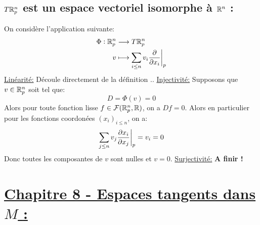    \subsection*{\( T\mathbb{R}^n_p \) est un espace vectoriel isomorphe à \( \mathbb{R}^n \) {:}}
   On considère l'application suivante:
   \[ 
      \begin{aligned}
         \Phi : \mathbb{R}^n_p &\longrightarrow T\mathbb{R}^n_p \\
         v &\longmapsto \sum_{i \leq n} v_i \frac{\partial }{\partial x_i}\biggr|_p
      \end{aligned} 
   \]
   \uline{Linéarité:} Découle directement de la définition ..\+
   \uline{Injectivité:} Supposons que \( v \in \mathbb{R}^n_p \) soit tel que:
   \[ 
      D = \Phi(v) = 0
   \]
   Alors pour toute fonction lisse \( f \in \mathcal{F}(\mathbb{R}^n_p, \mathbb{R}) \), on a \( Df = 0 \). Alors en particulier pour les fonctions coordonées \( (x_i)_{i \leq n} \), on a:
   \[ 
      \sum_{j \leq n}v_j \frac{\partial x_i}{\partial x_j}\biggr|_p = v_i = 0
   \]
   Donc toutes les composantes de \( v \) sont nulles et \( v = 0 \).\+
   \uline{Surjectivité:}
   {\textbf{\color{red} A finir !}}
\section*{\uline{Chapitre 8 - Espaces tangents dans \( M \) {:}}}
